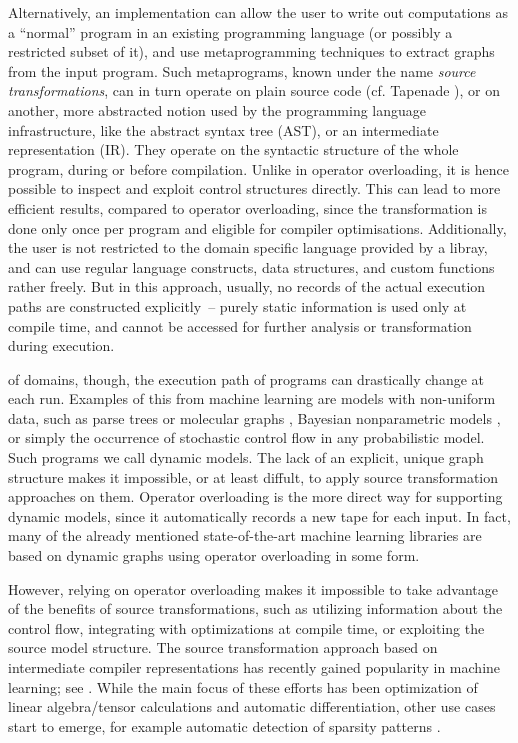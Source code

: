 Alternatively, an implementation can allow the user to write out computations as a \enquote{normal}
program in an existing programming language (or possibly a restricted subset of it), and use
metaprogramming techniques to extract graphs from the input program.  Such metaprograms, known under
the name \emph{source transformations}, can in turn operate on plain source code (cf. Tapenade
\parencite{tapenadedevelopers2019tapenade}), or on another, more abstracted notion used by the
programming language infrastructure, like the abstract syntax tree (AST), or an intermediate
representation (IR).  They operate on the syntactic structure of the whole program, during or before
compilation.  Unlike in operator overloading, it is hence possible to inspect and exploit control
structures directly. This can lead to more efficient results, compared to operator overloading,
since the transformation is done only once per program and eligible for compiler optimisations.
Additionally, the user is not restricted to the domain specific language provided by a libray, and
can use regular language constructs, data structures, and custom functions rather freely.  But in
this approach, usually, no records of the actual execution paths are constructed explicitly~--
purely static information is used only at compile time, and cannot be accessed for further analysis
or transformation during execution.

 of domains, though, the execution path of programs can drastically change
at each run.  Examples of this from machine learning are models with non-uniform data, such as parse
trees \parencite{socher2011parsing} or molecular graphs \parencite{bianucci2000application},
Bayesian nonparametric models \parencite{hjort2010bayesian}, or simply the occurrence of stochastic
control flow in any probabilistic model.  Such programs we call dynamic models.  The lack of an
explicit, unique graph structure makes it impossible, or at least diffult, to apply source
transformation approaches on them.  Operator overloading is the more direct way for supporting
dynamic models, since it automatically records a new tape for each input. In fact, many of the
already mentioned state-of-the-art machine learning libraries are based on dynamic graphs using
operator overloading in some form.

However, relying on operator overloading makes it impossible to take advantage of the benefits of
source transformations, such as utilizing information about the control flow, integrating with
optimizations at compile time, or exploiting the source model structure.  The source transformation
approach based on intermediate compiler representations has recently gained popularity in machine
learning; see \textcite{bradbury2018jax,lattner2020mlir}.  While the main focus of these efforts has
been optimization of linear algebra/tensor calculations and automatic differentiation, other use
cases start to emerge, for example automatic detection of sparsity patterns
\parencite{gowda2019sparsity}.

